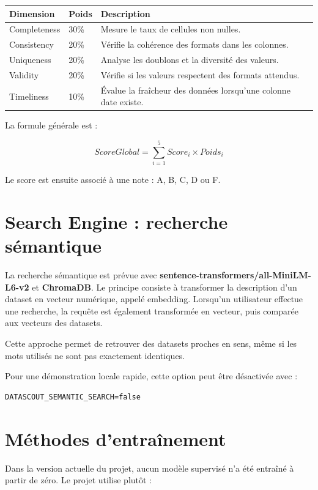 \documentclass[12pt,a4paper]{report}
\begin{document}
\begin{longtable}{p{4cm}p{2cm}p{8cm}}
\toprule
\textbf{Dimension} & \textbf{Poids} & \textbf{Description} \\
\midrule
Completeness & 30\% & Mesure le taux de cellules non nulles. \\
Consistency & 20\% & Vérifie la cohérence des formats dans les colonnes. \\
Uniqueness & 20\% & Analyse les doublons et la diversité des valeurs. \\
Validity & 20\% & Vérifie si les valeurs respectent des formats attendus. \\
Timeliness & 10\% & Évalue la fraîcheur des données lorsqu'une colonne date existe. \\
\bottomrule
\end{longtable}

La formule générale est :

\[
ScoreGlobal = \sum_{i=1}^{5} Score_i \times Poids_i
\]

Le score est ensuite associé à une note : A, B, C, D ou F.

\section{Search Engine : recherche sémantique}

La recherche sémantique est prévue avec \textbf{sentence-transformers/all-MiniLM-L6-v2} et \textbf{ChromaDB}. Le principe consiste à transformer la description d'un dataset en vecteur numérique, appelé embedding. Lorsqu'un utilisateur effectue une recherche, la requête est également transformée en vecteur, puis comparée aux vecteurs des datasets.

Cette approche permet de retrouver des datasets proches en sens, même si les mots utilisés ne sont pas exactement identiques.

Pour une démonstration locale rapide, cette option peut être désactivée avec :

\begin{verbatim}
DATASCOUT_SEMANTIC_SEARCH=false
\end{verbatim}

\section{Méthodes d'entraînement}

Dans la version actuelle du projet, aucun modèle supervisé n'a été entraîné à partir de zéro. Le projet utilise plutôt :
\end{document}
